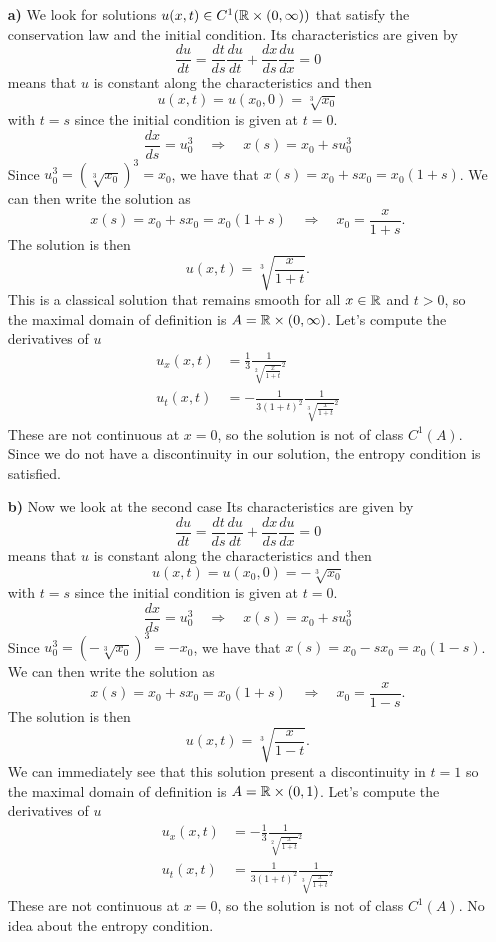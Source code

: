 \begin{enumerate}
    \item[\textbf{a)}] We look for solutions \(u(x, t) \in C^1(\mathbb{R} \times (0, \infty))\) that satisfy the conservation law and the initial condition. 
    Its characteristics are given by
    \[
        \frac{du}{dt} = \frac{dt}{ds} \frac{du}{dt} + \frac{dx}{ds} \frac{du}{dx} = 0
    \]
    means that \(u\) is constant along the characteristics and then 
    \[
        u(x,t) = u(x_0,0) = \sqrt[3]{x_0} 
    \]
    with \(t=s\) since the initial condition is given at \(t=0\). 
    \[
        \frac{dx}{ds} = u_0^3 \quad \Rightarrow \quad x(s) = x_0 + s u_0^3
    \]
    Since \(u_0^3 = (\sqrt[3]{x_0})^3 = x_0\), we have that \(x(s) = x_0 + s x_0 = x_0(1+s)\). We can then write the solution as 
    \[
        x(s) = x_0 + s x_0 = x_0(1+s) \quad \Rightarrow \quad x_0 = \frac{x}{1+s}.
    \]
    The solution is then
    \[
        u(x,t) = \sqrt[3]{\frac{x}{1+t}}.
    \]
    This is a classical solution that remains smooth for all \(x \in \mathbb{R}\) and \(t > 0\), so the maximal domain of definition is \(A = \mathbb{R} \times (0, \infty)\). Let's compute the derivatives of \(u\)
        \begin{align*}
            u_x(x,t) &= \frac{1}{3} \frac{1}{\sqrt[2]{\frac{x}{1+t}}^2} \\
            u_t(x,t) &= -\frac{1}{3(1+t)^2} \frac{1}{\sqrt[3]{\frac{x}{1+t}}^2}
        \end{align*}
    These are not continuous at \(x=0\), so the solution is not of class \(C^1(A)\). Since we do not have a discontinuity in our solution, the entropy condition is satisfied.
    \item[\textbf{b)}] Now we look at the second case
    Its characteristics are given by
    \[
        \frac{du}{dt} = \frac{dt}{ds} \frac{du}{dt} + \frac{dx}{ds} \frac{du}{dx} = 0
    \]
    means that \(u\) is constant along the characteristics and then 
    \[
        u(x,t) = u(x_0,0) = -\sqrt[3]{x_0} 
    \]
    with \(t=s\) since the initial condition is given at \(t=0\). 
    \[
        \frac{dx}{ds} = u_0^3 \quad \Rightarrow \quad x(s) = x_0 + s u_0^3
    \]
    Since \(u_0^3 = (-\sqrt[3]{x_0})^3 = -x_0\), we have that \(x(s) = x_0 - s x_0 = x_0(1-s)\). We can then write the solution as 
    \[
        x(s) = x_0 + s x_0 = x_0(1+s) \quad \Rightarrow \quad x_0 = \frac{x}{1-s}.
    \]
    The solution is then
    \[
        u(x,t) = \sqrt[3]{\frac{x}{1-t}}.
    \]
    We can immediately see that this solution present a discontinuity in \(t=1\) so the maximal domain of definition is \(A = \mathbb{R} \times (0, 1)\). Let's compute the derivatives of \(u\)
        \begin{align*}
            u_x(x,t) &= -\frac{1}{3} \frac{1}{\sqrt[2]{\frac{x}{1+t}}^2} \\
            u_t(x,t) &= \frac{1}{3(1+t)^2} \frac{1}{\sqrt[3]{\frac{x}{1+t}}^2}
        \end{align*}
    These are not continuous at \(x=0\), so the solution is not of class \(C^1(A)\). No idea about the entropy condition.
    \end{enumerate}


